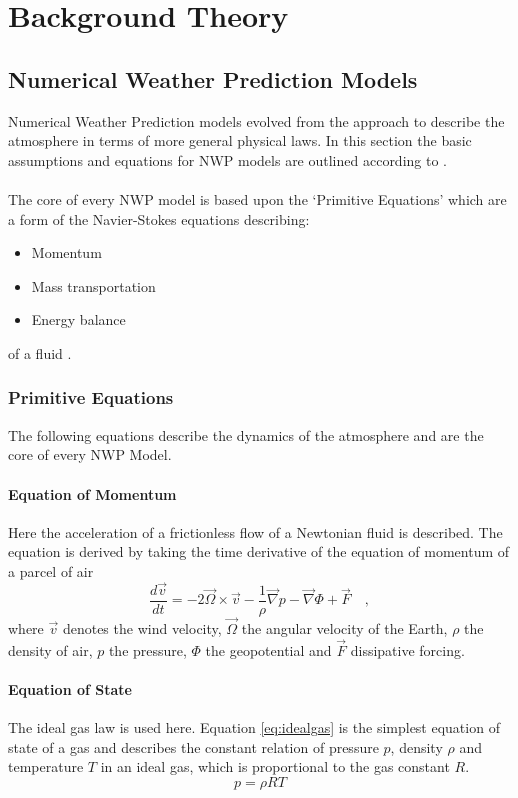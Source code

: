 \chapter{Background Theory}
\label{sec:bt}
\section{Numerical Weather Prediction Models}
Numerical Weather Prediction models evolved from the approach to describe the atmosphere in terms of more general physical laws. In this section the basic assumptions and equations for NWP models are outlined according to \citeauthor{coiffier2011fundamentals} \cite{coiffier2011fundamentals}.\\ \\
The core of every NWP model is based upon the `Primitive Equations' which are a form of the Navier-Stokes equations  describing: 
\begin{itemize}
\item{Momentum}
\item{Mass transportation}
\item{Energy balance}
\end{itemize}
 of a fluid \parencite{phillips1960problem}.
\subsection{Primitive Equations}
The following equations describe the dynamics of the atmosphere and are the core of every NWP Model.\\
\subsubsection{Equation of Momentum}
Here the acceleration of a frictionless flow of a Newtonian fluid is described. The equation is derived by taking the time derivative of the equation of momentum of a parcel of air
    \begin{equation}
        \frac{d \vec{v}}{dt} = -2 \vec{\Omega} \times \vec{v} - \frac{1}{\rho} \vec{\nabla} p - \vec {\nabla} \Phi + \vec{F} \quad ,
        \label{eq:Navier-Stokes}
    \end{equation}
where $\vec{v}$ denotes the wind velocity, $\vec{\Omega}$  the angular velocity of the Earth, $ \rho$ the density of air, $p$ the pressure, $\Phi$ the  geopotential and  $\vec{F}$ dissipative forcing. 

\subsubsection{Equation of State}
The ideal gas law is used here. Equation \ref{eq:idealgas} is the simplest equation of state of a gas and describes the constant relation of pressure $p$, density $\rho$ and temperature $T$ in  an ideal gas, which is proportional to the gas constant $R$.
    \begin{equation}
        p = \rho R T
    \label{eq:idealgas}    
    \end{equation}    

